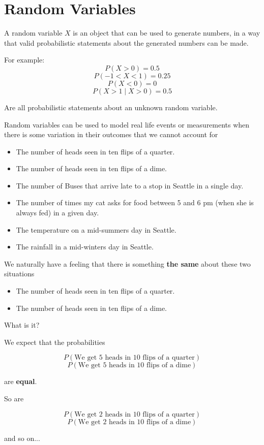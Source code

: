\section{Random Variables}

\begin{frame}
A random variable $X$ is an object that can be used to generate numbers, in a way that valid probabilistic statements about the generated numbers can be made. 

For example:
$$ P(X > 0) = 0.5 $$
$$ P(-1 < X < 1) = 0.25 $$
$$ P(X < 0) = 0 $$
$$ P(X > 1 \mid X > 0) = 0.5 $$

Are all probabilistic statements about an unknown random variable.
\end{frame}
%

%
\begin{frame}
Random variables can be used to model real life events or measurements when
there is some variation in their outcomes that we cannot account for

\begin{itemize}
\item The number of heads seen in ten flips of a quarter.
\item The number of heads seen in ten flips of a dime.
\item The number of Buses that arrive late to a stop in Seattle in a single
day.
\item The number of times my cat asks for food between 5 and 6 pm (when she is
always fed) in a given day.
\item The temperature on a mid-summers day in Seattle.
\item The rainfall in a mid-winters day in Seattle.
\end{itemize}

\end{frame}
%

%
\begin{frame}
We naturally have a feeling that there is something \textbf{the same} about
these two situations

\begin{itemize}
\item The number of heads seen in ten flips of a quarter.
\item The number of heads seen in ten flips of a dime.
\end{itemize}

What is it?
\end{frame}
%

%
\begin{frame}

We expect that the probabilities

$$ P(\text{We get 5 heads in 10 flips of a quarter}) $$
$$ P(\text{We get 5 heads in 10 flips of a dime}) $$

are \textbf{equal}.

So are

$$ P(\text{We get 2 heads in 10 flips of a quarter}) $$
$$ P(\text{We get 2 heads in 10 flips of a dime}) $$

and so on...
\end{frame}
%

